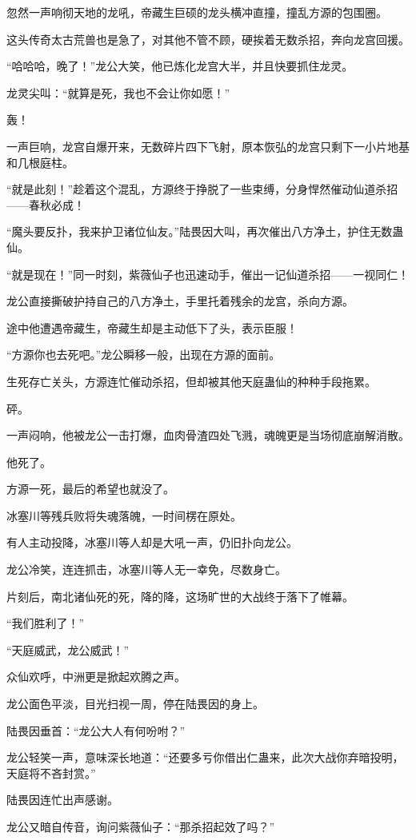 \begin{this_body}
忽然一声响彻天地的龙吼，帝藏生巨硕的龙头横冲直撞，撞乱方源的包围圈。

这头传奇太古荒兽也是急了，对其他不管不顾，硬挨着无数杀招，奔向龙宫回援。

“哈哈哈，晚了！”龙公大笑，他已炼化龙宫大半，并且快要抓住龙灵。

龙灵尖叫：“就算是死，我也不会让你如愿！”

轰！

一声巨响，龙宫自爆开来，无数碎片四下飞射，原本恢弘的龙宫只剩下一小片地基和几根庭柱。

“就是此刻！”趁着这个混乱，方源终于挣脱了一些束缚，分身悍然催动仙道杀招——春秋必成！

“魔头要反扑，我来护卫诸位仙友。”陆畏因大叫，再次催出八方净土，护住无数蛊仙。

“就是现在！”同一时刻，紫薇仙子也迅速动手，催出一记仙道杀招——一视同仁！

龙公直接撕破护持自己的八方净土，手里托着残余的龙宫，杀向方源。

途中他遭遇帝藏生，帝藏生却是主动低下了头，表示臣服！

“方源你也去死吧。”龙公瞬移一般，出现在方源的面前。

生死存亡关头，方源连忙催动杀招，但却被其他天庭蛊仙的种种手段拖累。

砰。

一声闷响，他被龙公一击打爆，血肉骨渣四处飞溅，魂魄更是当场彻底崩解消散。

他死了。

方源一死，最后的希望也就没了。

冰塞川等残兵败将失魂落魄，一时间楞在原处。

有人主动投降，冰塞川等人却是大吼一声，仍旧扑向龙公。

龙公冷笑，连连抓击，冰塞川等人无一幸免，尽数身亡。

片刻后，南北诸仙死的死，降的降，这场旷世的大战终于落下了帷幕。

“我们胜利了！”

“天庭威武，龙公威武！”

众仙欢呼，中洲更是掀起欢腾之声。

龙公面色平淡，目光扫视一周，停在陆畏因的身上。

陆畏因垂首：“龙公大人有何吩咐？”

龙公轻笑一声，意味深长地道：“还要多亏你借出仁蛊来，此次大战你弃暗投明，天庭将不吝封赏。”

陆畏因连忙出声感谢。

龙公又暗自传音，询问紫薇仙子：“那杀招起效了吗？”


\end{this_body}
